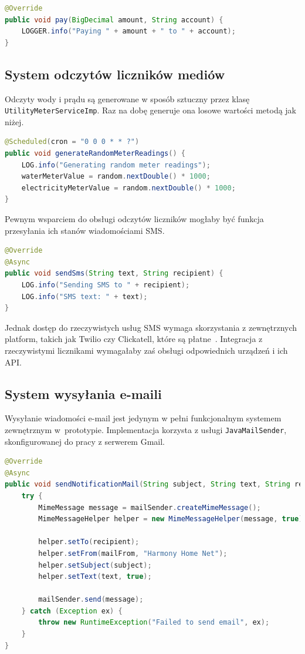 \begin{lstlisting}[language=Java, style=JavaStyle, caption=Fragment klasy \texttt{BankingServiceImp}]
@Override
public void pay(BigDecimal amount, String account) {
    LOGGER.info("Paying " + amount + " to " + account);
}
\end{lstlisting}

\subsection{System odczytów liczników mediów}
Odczyty wody i prądu są generowane w sposób sztuczny przez klasę \texttt{UtilityMeterServiceImp}. Raz na dobę generuje ona losowe wartości metodą jak niżej.
\begin{lstlisting}[language=Java, style=JavaStyle, caption=Fragment klasy \texttt{UtilityMeterServiceImp}]
@Scheduled(cron = "0 0 0 * * ?")
public void generateRandomMeterReadings() {
    LOG.info("Generating random meter readings");
    waterMeterValue = random.nextDouble() * 1000;
    electricityMeterValue = random.nextDouble() * 1000;
}
\end{lstlisting}

Pewnym wsparciem do obsługi odczytów liczników mogłaby być funkcja przesyłania ich stanów wiadomościami SMS.
\begin{lstlisting}[language=Java, style=JavaStyle, caption=Fragment klasy \texttt{SmsServiceImp}]
@Override
@Async
public void sendSms(String text, String recipient) {
    LOG.info("Sending SMS to " + recipient);
    LOG.info("SMS text: " + text);
}
\end{lstlisting}
Jednak dostęp do rzeczywistych usług SMS wymaga skorzystania z zewnętrznych platform, takich jak Twilio czy Clickatell, które są płatne~\cite{twilio, clickatell}.
Integracja z rzeczywistymi licznikami wymagałaby zaś obsługi odpowiednich urządzeń i ich API.

\subsection{System wysyłania e-maili}

Wysyłanie wiadomości e-mail jest jedynym w pełni funkcjonalnym systemem zewnętrznym w~prototypie. Implementacja korzysta z usługi \texttt{JavaMailSender}, skonfigurowanej do pracy z serwerem Gmail.

\begin{lstlisting}[language=Java, style=JavaStyle, caption=Fragment klasy \texttt{MailServiceImp}]
@Override
@Async
public void sendNotificationMail(String subject, String text, String recipient) {
    try {
        MimeMessage message = mailSender.createMimeMessage();
        MimeMessageHelper helper = new MimeMessageHelper(message, true);

        helper.setTo(recipient);
        helper.setFrom(mailFrom, "Harmony Home Net");
        helper.setSubject(subject);
        helper.setText(text, true);

        mailSender.send(message);
    } catch (Exception ex) {
        throw new RuntimeException("Failed to send email", ex);
    }
}
\end{lstlisting}


